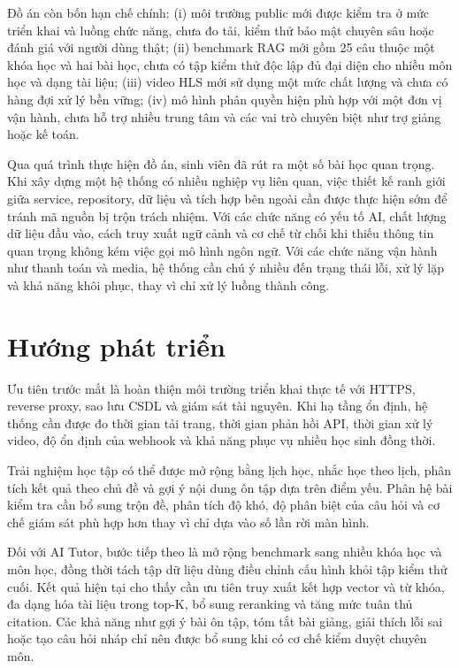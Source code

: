 \documentclass[../DoAn.tex]{subfiles}
\begin{document}
Đồ án còn bốn hạn chế chính: (i) môi trường public mới được kiểm tra ở mức triển khai và luồng chức năng, chưa đo tải, kiểm thử bảo mật chuyên sâu hoặc đánh giá với người dùng thật; (ii) benchmark RAG mới gồm 25 câu thuộc một khóa học và hai bài học, chưa có tập kiểm thử độc lập đủ đại diện cho nhiều môn học và dạng tài liệu; (iii) video HLS mới sử dụng một mức chất lượng và chưa có hàng đợi xử lý bền vững; (iv) mô hình phân quyền hiện phù hợp với một đơn vị vận hành, chưa hỗ trợ nhiều trung tâm và các vai trò chuyên biệt như trợ giảng hoặc kế toán.

Qua quá trình thực hiện đồ án, sinh viên đã rút ra một số bài học quan trọng. Khi xây dựng một hệ thống có nhiều nghiệp vụ liên quan, việc thiết kế ranh giới giữa service, repository, dữ liệu và tích hợp bên ngoài cần được thực hiện sớm để tránh mã nguồn bị trộn trách nhiệm. Với các chức năng có yếu tố AI, chất lượng dữ liệu đầu vào, cách truy xuất ngữ cảnh và cơ chế từ chối khi thiếu thông tin quan trọng không kém việc gọi mô hình ngôn ngữ. Với các chức năng vận hành như thanh toán và media, hệ thống cần chú ý nhiều đến trạng thái lỗi, xử lý lặp và khả năng khôi phục, thay vì chỉ xử lý luồng thành công.

\section{Hướng phát triển}

Ưu tiên trước mắt là hoàn thiện môi trường triển khai thực tế với HTTPS, reverse proxy, sao lưu CSDL và giám sát tài nguyên. Khi hạ tầng ổn định, hệ thống cần được đo thời gian tải trang, thời gian phản hồi API, thời gian xử lý video, độ ổn định của webhook và khả năng phục vụ nhiều học sinh đồng thời.

Trải nghiệm học tập có thể được mở rộng bằng lịch học, nhắc học theo lịch, phân tích kết quả theo chủ đề và gợi ý nội dung ôn tập dựa trên điểm yếu. Phân hệ bài kiểm tra cần bổ sung trộn đề, phân tích độ khó, độ phân biệt của câu hỏi và cơ chế giám sát phù hợp hơn thay vì chỉ dựa vào số lần rời màn hình.

Đối với AI Tutor, bước tiếp theo là mở rộng benchmark sang nhiều khóa học và môn học, đồng thời tách tập dữ liệu dùng điều chỉnh cấu hình khỏi tập kiểm thử cuối. Kết quả hiện tại cho thấy cần ưu tiên truy xuất kết hợp vector và từ khóa, đa dạng hóa tài liệu trong top-K, bổ sung reranking và tăng mức tuân thủ citation. Các khả năng như gợi ý bài ôn tập, tóm tắt bài giảng, giải thích lỗi sai hoặc tạo câu hỏi nháp chỉ nên được bổ sung khi có cơ chế kiểm duyệt chuyên môn.
\end{document}
